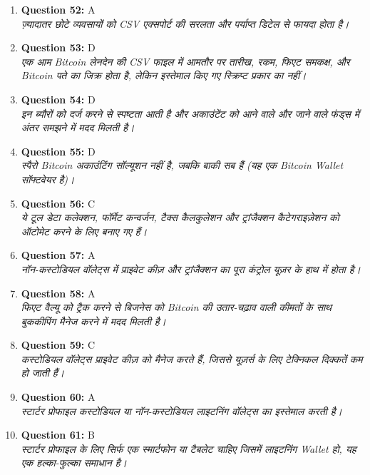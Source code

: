 \documentclass[12pt,a4paper]{article}
\begin{document}
\begin{enumerate}
\item \textbf{Question 52:} A
\\ \textit{ज़्यादातर छोटे व्यवसायों को CSV एक्सपोर्ट की सरलता और पर्याप्त डिटेल से फायदा होता है।}

\item \textbf{Question 53:} D
\\ \textit{एक आम Bitcoin लेनदेन की CSV फाइल में आमतौर पर तारीख, रकम, फिएट समकक्ष, और Bitcoin पते का जिक्र होता है, लेकिन इस्तेमाल किए गए स्क्रिप्ट प्रकार का नहीं।}

\item \textbf{Question 54:} D
\\ \textit{इन ब्यौरों को दर्ज करने से स्पष्टता आती है और अकाउंटेंट को आने वाले और जाने वाले फंड्स में अंतर समझने में मदद मिलती है।}

\item \textbf{Question 55:} D
\\ \textit{स्पैरो Bitcoin अकाउंटिंग सॉल्यूशन नहीं है, जबकि बाकी सब हैं (यह एक Bitcoin Wallet सॉफ्टवेयर है)।}

\item \textbf{Question 56:} C
\\ \textit{ये टूल डेटा कलेक्शन, फॉर्मेट कन्वर्जन, टैक्स कैलकुलेशन और ट्रांजैक्शन कैटेगराइज़ेशन को ऑटोमेट करने के लिए बनाए गए हैं।}

\item \textbf{Question 57:} A
\\ \textit{नॉन-कस्टोडियल वॉलेट्स में प्राइवेट कीज़ और ट्रांजैक्शन का पूरा कंट्रोल यूज़र के हाथ में होता है।}

\item \textbf{Question 58:} A
\\ \textit{फिएट वैल्यू को ट्रैक करने से बिजनेस को Bitcoin की उतार-चढ़ाव वाली कीमतों के साथ बुककीपिंग मैनेज करने में मदद मिलती है।}

\item \textbf{Question 59:} C
\\ \textit{कस्टोडियल वॉलेट्स प्राइवेट कीज़ को मैनेज करते हैं, जिससे यूज़र्स के लिए टेक्निकल दिक्कतें कम हो जाती हैं।}

\item \textbf{Question 60:} A
\\ \textit{स्टार्टर प्रोफाइल कस्टोडियल या नॉन-कस्टोडियल लाइटनिंग वॉलेट्स का इस्तेमाल करती है।}

\item \textbf{Question 61:} B
\\ \textit{स्टार्टर प्रोफाइल के लिए सिर्फ एक स्मार्टफोन या टैबलेट चाहिए जिसमें लाइटनिंग Wallet हो, यह एक हल्का-फुल्का समाधान है।}


\end{enumerate}
\end{document}
